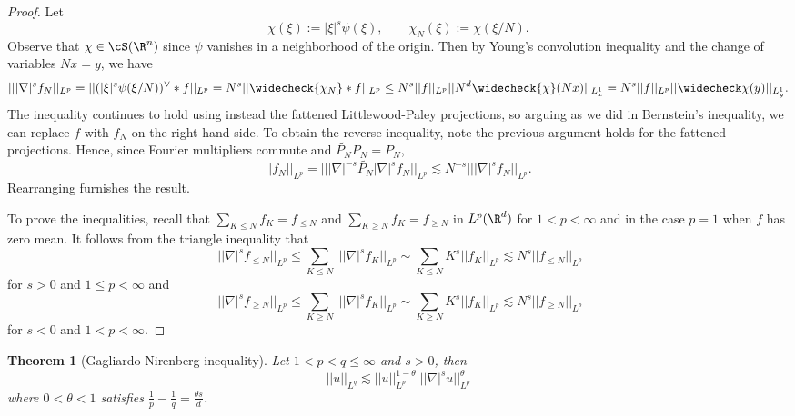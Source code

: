 \documentclass[reqno]{amsart}
\newtheorem{theorem}{Theorem}
\theoremstyle{definition}
\theoremstyle{remark}
\begin{document}
\begin{proof}
	Let 
		\[ \chi (\xi) := |\xi|^s \psi (\xi), \qquad \chi_N (\xi) := \chi (\xi/N). \]
	Observe that $\chi \in \cS (\R^n)$ since $\psi$ vanishes in a neighborhood of the origin. Then by Young's convolution inequality and the change of variables $Nx = y$, we have
		\[ || |\nabla|^s f_N||_{L^p} = || ({|\xi|^s \psi (\xi/N)})^{\vee} * f ||_{L^p} = N^s ||\widecheck{\chi_N} * f||_{L^p} \leq N^s ||f||_{L^p} ||N^d \widecheck{\chi} (N x)||_{L^1_x} = N^s ||f||_{L^p} ||\widecheck \chi(y)||_{L^1_y}. \]	
	The inequality continues to hold using instead the fattened Littlewood-Paley projections, so arguing as we did in Bernstein's inequality, we can replace $f$ with $f_N$ on the right-hand side. To obtain the reverse inequality, note the previous argument holds for the fattened projections. Hence, since Fourier multipliers commute and $\widetilde{P_N} P_N = P_N$,
		\[ ||f_N||_{L^p} = || |\nabla|^{-s} \widetilde{P_N} |\nabla|^s f_N||_{L^p} \lesssim N^{-s} || |\nabla|^s f_N||_{L^p}.  \]
	Rearranging furnishes the result. 	

	To prove the inequalities, recall that $\sum_{K \leq N} f_K = f_{\leq N}$ and $\sum_{K \geq N} f_K = f_{\geq N}$ in $L^p (\R^d)$ for $1 < p < \infty$ and in the case $p = 1$ when $f$ has zero mean. It follows from the triangle inequality that
		\[	|| |\nabla|^s f_{\leq N} ||_{L^p} \leq \sum_{K \leq N} || | \nabla|^s f_K||_{L^p} \sim \sum_{K \leq N} K^s ||f_K||_{L^p} \lesssim N^s ||f_{\leq N} ||_{L^p}\]
	for $s > 0$ and $1 \leq p < \infty$ and
		\[	|| |\nabla|^s f_{\geq N} ||_{L^p} \leq \sum_{K \geq N} || | \nabla|^s f_K||_{L^p} \sim \sum_{K \geq N} K^s ||f_K||_{L^p} \lesssim N^s ||f_{\geq N} ||_{L^p}\]
	for $s < 0$ and $1 < p < \infty$. 
\end{proof}



\begin{theorem}[Gagliardo-Nirenberg inequality]
	Let $1 < p < q \leq \infty$ and $s > 0$, then 
		\[ ||u||_{L^q} \lesssim ||u||_{L^p}^{1 - \theta} || |\nabla|^s u ||_{L^p}^\theta \]
	where $0 < \theta < 1$ satisfies $\tfrac1p - \tfrac1q = \tfrac{\theta s}{d}$. 	
\end{theorem}
\end{document}
